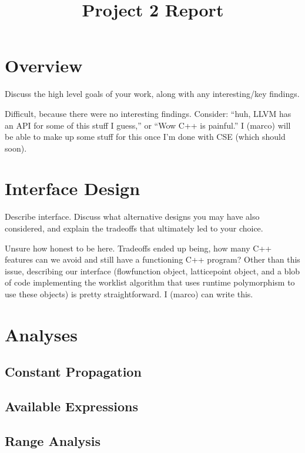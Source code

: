 \documentclass{article}
\title{Project 2 Report}
\theoremstyle{definition}
\begin{document}
\maketitle

\section{Overview}
\begin{framed}
  Discuss the high level goals of your work, along with any
  interesting/key findings.
\end{framed}


Difficult, because there were no interesting findings. Consider:
``huh, LLVM has an API for some of this stuff I guess,'' or ``Wow C++
is painful.'' I (marco) will be able to make up some stuff for this
once I'm done with CSE (which should soon).

\section{Interface Design}
\begin{framed}
  Describe interface. Discuss what alternative designs you may have
  also considered, and explain the tradeoffs that ultimately led to
  your choice.
\end{framed}

Unsure how honest to be here. Tradeoffs ended up being, how many C++
features can we avoid and still have a functioning C++ program? Other
than this issue, describing our interface (flowfunction object,
latticepoint object, and a blob of code implementing the worklist
algorithm that uses runtime polymorphism to use these objects) is
pretty straightforward. I (marco) can write this.

\section{Analyses}

\subsection{Constant Propagation}


\subsection{Available Expressions}


\subsection{Range Analysis}

\end{document}
